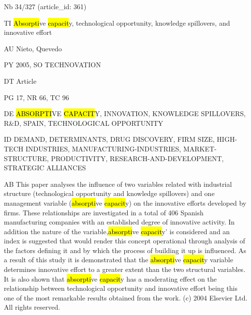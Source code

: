 \documentclass[a4paper]{article}
\begin{document}
\vspace*{-2cm}
Nb \tabto{0cm}34/327 (article\_id: 361)\par
TI \tabto{0cm}\hl{Absorpti}ve \hl{capacit}y, technological opportunity, knowledge spillovers, and innovative effort\par
AU \tabto{0cm}Nieto, Quevedo\par
PY \tabto{0cm}2005, SO TECHNOVATION\par
DT \tabto{0cm}Article\par
PG \tabto{0cm}17, NR 66, TC 96\par
DE \tabto{0cm}\hl{ABSORPTI}VE \hl{CAPACIT}Y, INNOVATION, KNOWLEDGE SPILLOVERS, R\&D, SPAIN, TECHNOLOGICAL OPPORTUNITY\par
ID \tabto{0cm}DEMAND, DETERMINANTS, DRUG DISCOVERY, FIRM SIZE, HIGH-TECH INDUSTRIES, MANUFACTURING-INDUSTRIES, MARKET-STRUCTURE, PRODUCTIVITY, RESEARCH-AND-DEVELOPMENT, STRATEGIC ALLIANCES\par
AB \tabto{0cm}This paper analyses the influence of two variables related with industrial structure (technological opportunity and knowledge spillovers) and one management variable (\hl{absorpti}ve \hl{capacit}y) on the innovative efforts developed by firms. These relationships are investigated in a total of 406 Spanish manufacturing companies with an established degree of innovative activity. In addition the nature of the variable,\hl{absorpti}ve \hl{capacit}y' is considered and an index is suggested that would render this concept operational through analysis of the factors defining it and by which the process of building it up is influenced. As a result of this study it is demonstrated that the \hl{absorpti}ve \hl{capacit}y variable determines innovative effort to a greater extent than the two structural variables. It is also shown that \hl{absorpti}ve \hl{capacit}y has a moderating effect on the relationship between technological opportunity and innovative effort being this one of the most remarkable results obtained from the work. (c) 2004 Elsevier Ltd. All rights reserved.\par
\clearpage
\end{document}
